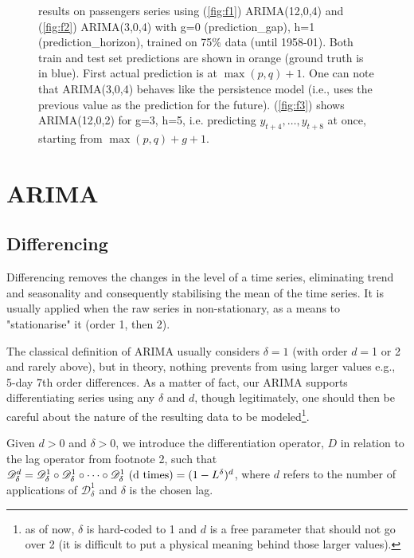 \documentclass{article}
\begin{document}
\begin{figure}
  \caption{results on passengers series using (\ref{fig:f1}) ARIMA(12,0,4) and (\ref{fig:f2}) ARIMA(3,0,4) with g=0 ({\selectfont prediction\_gap}), h=1 ({\selectfont prediction\_horizon}), trained on 75\% data (until 1958-01). Both train and test set predictions are shown in orange (ground truth is in blue). First actual prediction is at $\max(p,q)+1$. One can note that ARIMA(3,0,4) behaves like the persistence model (i.e., uses the previous value as the prediction for the future). (\ref{fig:f3}) shows ARIMA(12,0,2) for g=3, h=5, i.e. predicting $y_{t+4}, \dots, y_{t+8}$ at once, starting from $\max(p,q)+g+1$.}
  \label{fig:fig1}
\end{figure}



\section{ARIMA}
\subsection{Differencing}
\label{diff}
Differencing removes the changes in the level of a time series, eliminating trend and seasonality and consequently stabilising the mean of the time series. It is usually applied when the raw series in non-stationary, as a means to "stationarise" it (order 1, then 2).

The classical definition of ARIMA usually considers $\delta=1$ (with order $d=$1 or 2 and rarely above), but in theory, nothing prevents from using larger values e.g., 5-day 7th order differences. As a matter of fact, our ARIMA supports differentiating series using any $\delta$ and $d$, though legitimately, one should then be careful about the nature of the resulting data to be modeled\footnote{as of now, $\delta$ is hard-coded to 1 and $d$ is a free parameter that should not go over 2 (it is difficult to put a physical meaning behind those larger values).}.

Given $d>0$ and $\delta>0$, we introduce the differentiation operator, $D$ in relation to the lag operator from footnote 2, such that $\mathcal{D}_{\delta}^d=\mathcal{D}_{\delta}^1 \circ \mathcal{D}_{\delta}^1 \circ \dots \circ \mathcal{D}_{\delta}^1 \textmd{ (d times)}= (1-L^{\delta})^d$, where $d$ refers to the number of applications of $\mathcal{D}^1_{\delta}$ and $\delta$ is the chosen lag. \\
\end{document}
